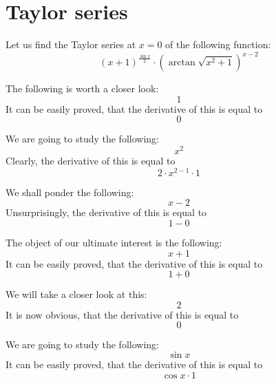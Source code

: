 \documentclass{article}
\begin{document}
\newpage
\section{Taylor series}
Let us find the Taylor series at $x = 0$ of the following function:
\begin{equation}
\left( x + 1 \right) ^{\frac{\sin x }{2 } } \cdot \left( \arctan \sqrt {x ^{2 } + 1 } \right) ^{x - 2 } 
\end{equation}

The following is worth a closer look:
\begin{equation}
1 
\end{equation}
It can be easily proved, that the derivative of this is equal to
\begin{equation}
0 
\end{equation}

We are going to study the following:
\begin{equation}
x ^{2 } 
\end{equation}
Clearly, the derivative of this is equal to
\begin{equation}
2 \cdot x ^{2 - 1 } \cdot 1 
\end{equation}

We shall ponder the following:
\begin{equation}
x - 2 
\end{equation}
Unsurprisingly, the derivative of this is equal to
\begin{equation}
1 - 0 
\end{equation}

The object of our ultimate interest is the following:
\begin{equation}
x + 1 
\end{equation}
It can be easily proved, that the derivative of this is equal to
\begin{equation}
1 + 0 
\end{equation}

We will take a closer look at this:
\begin{equation}
2 
\end{equation}
It is now obvious, that the derivative of this is equal to
\begin{equation}
0 
\end{equation}

We are going to study the following:
\begin{equation}
\sin x 
\end{equation}
It can be easily proved, that the derivative of this is equal to
\begin{equation}
\cos x \cdot 1 
\end{equation}
\end{document}
